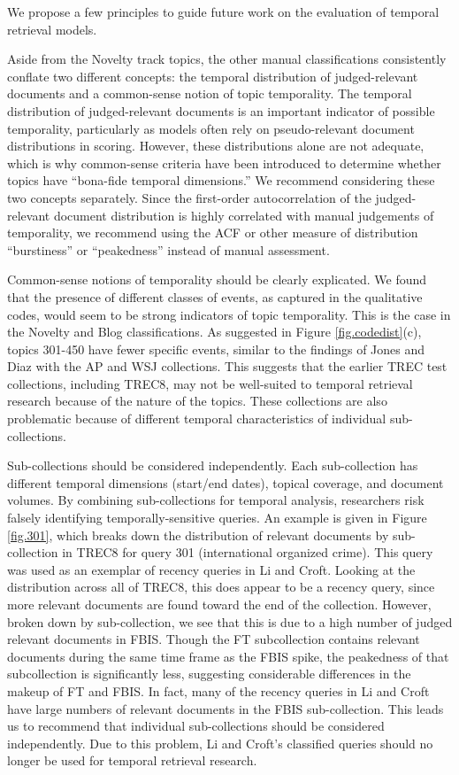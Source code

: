 \documentclass{sig-alternate}
\begin{document}
We propose a few principles to guide future work on the evaluation of temporal retrieval models.

Aside from the Novelty track topics, the other manual classifications consistently conflate two different concepts: the temporal distribution of judged-relevant documents and a common-sense notion of topic temporality. The temporal distribution of judged-relevant documents is an important indicator of possible temporality, particularly as models often rely on pseudo-relevant document distributions in scoring. However, these distributions alone are not adequate, which is why common-sense criteria have been introduced to determine whether topics have ``bona-fide temporal dimensions.'' We recommend considering these two concepts separately.  Since the first-order autocorrelation of the judged-relevant document distribution is highly correlated with manual judgements of temporality, we recommend using the ACF or other measure of distribution ``burstiness'' or ``peakedness'' instead of manual assessment.  

Common-sense notions of temporality should be clearly explicated.  We found that the presence of different classes of events, as captured in the qualitative codes, would seem to be strong indicators of topic temporality.  This is the case in the Novelty and Blog classifications. As suggested in Figure \ref{fig.codedist}(c), topics 301-450 have fewer specific events, similar to the findings of Jones and Diaz with the AP and WSJ collections. This suggests that the earlier TREC test collections, including TREC8, may not be well-suited to temporal retrieval research because of the nature of the topics. These collections are also problematic because of different temporal characteristics of individual sub-collections.

Sub-collections should be considered independently. Each sub-collection has different temporal dimensions (start/end dates), topical coverage, and document volumes. By combining sub-collections for temporal analysis, researchers risk falsely identifying temporally-sensitive queries. An example is given in Figure \ref{fig.301}, which breaks down the distribution of relevant documents by sub-collection in TREC8 for query 301 (international organized crime). This query was used as an exemplar of recency queries in Li and Croft. Looking at the distribution across all of TREC8, this does appear to be a recency query, since more relevant documents are found toward the end of the collection. However, broken down by sub-collection, we see that this is due to a high number of judged relevant documents in FBIS. Though the FT subcollection contains relevant documents during the same time frame as the FBIS spike, the peakedness of that subcollection is significantly less, suggesting considerable differences in the makeup of FT and FBIS. In fact, many of the recency queries in Li and Croft have large numbers of relevant documents in the FBIS sub-collection.    This leads us to recommend that individual sub-collections should be considered independently. Due to this problem, Li and Croft's classified queries should no longer be used for temporal retrieval research.
\end{document}
